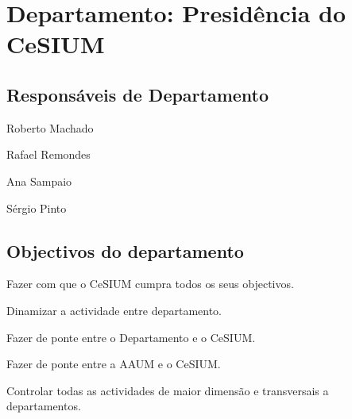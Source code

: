\section{Departamento: Presidência do CeSIUM}

\subsection{Responsáveis de Departamento}
\begin{itemizedash}
	\item Roberto Machado
	\item Rafael Remondes
	\item Ana Sampaio
	\item Sérgio Pinto
\end{itemizedash}

\subsection{Objectivos do departamento}
\lipsum[2]
\begin{itemizedash}
	\item Fazer com que o CeSIUM cumpra todos os seus objectivos.
	\item Dinamizar a actividade entre departamento.
	\item Fazer de ponte entre o Departamento e o CeSIUM.
	\item Fazer de ponte entre a AAUM e o CeSIUM.
	\item Controlar todas as actividades de maior dimensão e transversais a departamentos.
\end{itemizedash}
